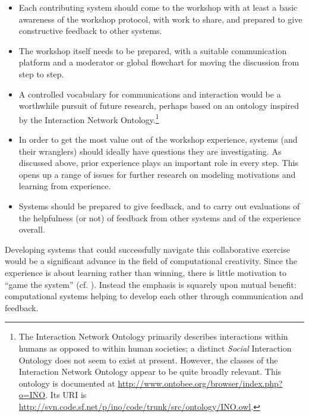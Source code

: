 \begin{itemize}
\item Each contributing system should come to the workshop with at
  least a basic awareness of the workshop protocol, with work to
  share, and prepared to give constructive feedback to other systems.
\item The workshop itself needs to be prepared, with a suitable
  communication platform and a moderator or global flowchart for
  moving the discussion from step to step.
 \item A controlled vocabulary for communications and interaction
   would be a worthwhile pursuit of future research, perhaps based on
   an ontology inspired by the Interaction Network
   Ontology.\footnote{The Interaction Network Ontology primarily describes
     interactions within humans as opposed to within human societies;
     a distinct \emph{Social} Interaction Ontology does not seem to
     exist at present.  However, the classes of the Interaction Network Ontology appear to be quite broadly relevant.
     This ontology is documented
     at \url{http://www.ontobee.org/browser/index.php?o=INO}.  Its URI
     is
     \url{http://svn.code.sf.net/p/ino/code/trunk/src/ontology/INO.owl}.}
\item In order to get the most value out of the workshop experience,
  systems (and their wranglers) should ideally have questions they are
  investigating.  As discussed above, prior experience plays an
  important role in every step.  This opens up a range of issues for
  further research on modeling motivations and learning from
  experience.
\item Systems should be prepared to give feedback, and to carry out
  evaluations of the helpfulness (or not) of feedback from other
  systems and of the experience overall.
\end{itemize}
  
  Developing systems that could successfully navigate this
  collaborative exercise would be a significant advance in the field
  of computational creativity.  Since the experience is about learning
  rather than winning, there is little motivation to ``game the
  system'' (cf. ). Instead the emphasis is
  squarely upon mutual benefit: computational systems helping to
  develop each other through communication and feedback.
